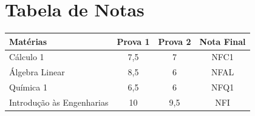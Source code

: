 \documentclass[a4paper,12pt]{article}
\begin{document}
\section{Tabela de Notas} %

\begin{center} %
\begin{tabular}{|l|c|c|c|} %
    \hline %
    \textbf{Matérias} & \textbf{Prova 1} & \textbf{Prova 2} & \textbf{Nota Final} \\ %
    \hline %
    Cálculo 1 & 7,5 & 7 & NFC1 \\ %
    \hline %
    Álgebra Linear & 8,5 & 6 & NFAL \\
    \hline
    Química 1 & 6,5 & 6 & NFQ1 \\
    \hline
    Introdução às Engenharias & 10 & 9,5 & NFI \\
    \hline
\end{tabular}
\end{center}
\end{document}
